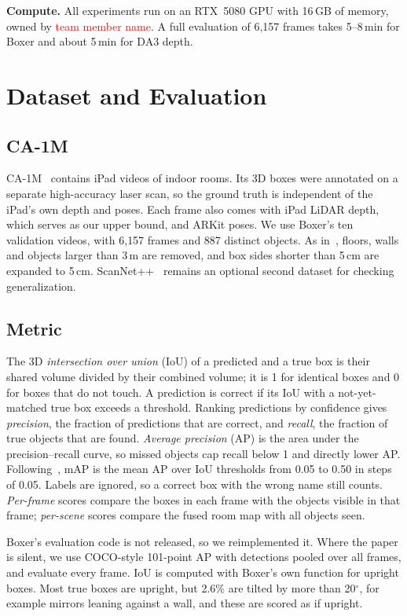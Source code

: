 \documentclass[conference]{IEEEtran}
\newcommand{\tbd}[1]{\textcolor{red}{#1}}
\begin{document}
\textbf{Compute.} All experiments run on an RTX~5080 GPU with 16\,GB of memory, owned by \tbd{team member name}. A full evaluation of 6{,}157 frames takes 5--8\,min for Boxer and about 5\,min for DA3 depth.

\section{Dataset and Evaluation}
\subsection{CA-1M}
CA-1M~\cite{ca1m} contains iPad videos of indoor rooms. Its 3D boxes were annotated on a separate high-accuracy laser scan, so the ground truth is independent of the iPad's own depth and poses. Each frame also comes with iPad LiDAR depth, which serves as our upper bound, and ARKit poses. We use Boxer's ten validation videos, with 6{,}157 frames and 887 distinct objects. As in~\cite{boxer}, floors, walls and objects larger than 3\,m are removed, and box sides shorter than 5\,cm are expanded to 5\,cm. ScanNet++~\cite{scannetpp} remains an optional second dataset for checking generalization.

\subsection{Metric}
\label{sec:metric}
The 3D \emph{intersection over union} (IoU) of a predicted and a true box is their shared volume divided by their combined volume; it is 1 for identical boxes and 0 for boxes that do not touch. A prediction is correct if its IoU with a not-yet-matched true box exceeds a threshold. Ranking predictions by confidence gives \emph{precision}, the fraction of predictions that are correct, and \emph{recall}, the fraction of true objects that are found. \emph{Average precision} (AP) is the area under the precision--recall curve, so missed objects cap recall below 1 and directly lower AP. Following~\cite{boxer,omni3d}, mAP is the mean AP over IoU thresholds from 0.05 to 0.50 in steps of 0.05. Labels are ignored, so a correct box with the wrong name still counts. \emph{Per-frame} scores compare the boxes in each frame with the objects visible in that frame; \emph{per-scene} scores compare the fused room map with all objects seen.

Boxer's evaluation code is not released, so we reimplemented it. Where the paper is silent, we use COCO-style 101-point AP with detections pooled over all frames, and evaluate every frame. IoU is computed with Boxer's own function for upright boxes. Most true boxes are upright, but 2.6\% are tilted by more than 20$^\circ$, for example mirrors leaning against a wall, and these are scored as if upright.
\end{document}
